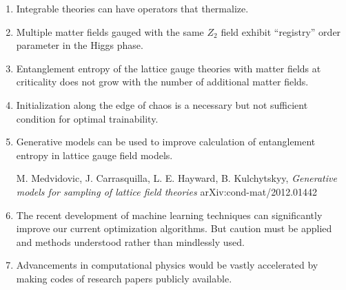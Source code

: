 \documentclass[pdftex,a5paper]{dissertation}
\begin{document}
{\small
\begin{enumerate}[leftmargin=*]
\setlength\itemsep{0.8em}

\item Integrable theories can have operators that thermalize.
\vspace{-10pt}
\begin{flushright}
\end{flushright}

\item Multiple matter fields gauged with the same $Z_2$ field exhibit ``registry'' order parameter in the Higgs phase.  
\vspace{-10pt}
\begin{flushright}
\end{flushright}


\item Entanglement entropy of the lattice gauge theories with matter fields at criticality does not grow with the number of additional matter fields. 
\vspace{-10pt}
\begin{flushright}
\end{flushright}

\item Initialization along the edge of chaos is a necessary but not sufficient condition for optimal trainability. 
\vspace{-10pt}
\begin{flushright}
\end{flushright}

\item Generative models can be used to improve calculation of entanglement entropy in lattice gauge field models.
\vspace{-2pt}
\begin{flushright}
	M. Medvidovic, J. Carrasquilla, L. E. Hayward, B. Kulchytskyy, \emph{Generative models for sampling of lattice field theories
	} arXiv:cond-mat/2012.01442
\end{flushright}

\item The recent development of machine learning techniques can significantly improve our current optimization algorithms. But caution must be applied and methods understood rather than mindlessly used.

\item Advancements in computational physics would be vastly accelerated by making codes of research papers publicly available. 


\end{enumerate}}
\end{document}
